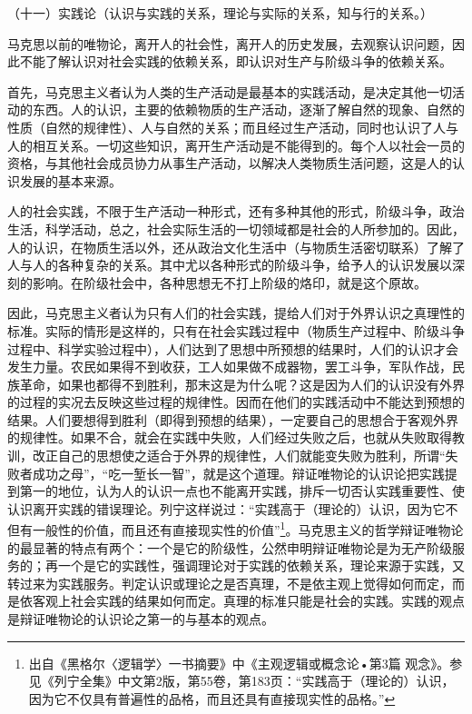 \documentclass[UTF8, 12pt, a4paper]{ctexrep}
\begin{document}
（十一）实践论（认识与实践的关系，理论与实际的关系，知与行的关系。）

马克思以前的唯物论，离开人的社会性，离开人的历史发展，去观察认识问题，因此不能了解认识对社会实践的依赖关系，即认识对生产与阶级斗争的依赖关系。

首先，马克思主义者认为人类的生产活动是最基本的实践活动，是决定其他一切活动的东西。人的认识，主要的依赖物质的生产活动，逐渐了解自然的现象、自然的性质（自然的规律性）、人与自然的关系；而且经过生产活动，同时也认识了人与人的相互关系。一切这些知识，离开生产活动是不能得到的。每个人以社会一员的资格，与其他社会成员协力从事生产活动，以解决人类物质生活问题，这是人的认识发展的基本来源。

人的社会实践，不限于生产活动一种形式，还有多种其他的形式，阶级斗争，政治生活，科学活动，总之，社会实际生活的一切领域都是社会的人所参加的。因此，人的认识，在物质生活以外，还从政治文化生活中（与物质生活密切联系）了解了人与人的各种复杂的关系。其中尤以各种形式的阶级斗争，给予人的认识发展以深刻的影响。在阶级社会中，各种思想无不打上阶级的烙印，就是这个原故。

因此，马克思主义者认为只有人们的社会实践，提给人们对于外界认识之真理性的标准。实际的情形是这样的，只有在社会实践过程中（物质生产过程中、阶级斗争过程中、科学实验过程中），人们达到了思想中所预想的结果时，人们的认识才会发生力量。农民如果得不到收获，工人如果做不成器物，罢工斗争，军队作战，民族革命，如果也都得不到胜利，那末这是为什么呢？这是因为人们的认识没有外界的过程的实况去反映这些过程的规律性。因而在他们的实践活动中不能达到预想的结果。人们要想得到胜利（即得到预想的结果），一定要自己的思想合于客观外界的规律性。如果不合，就会在实践中失败，人们经过失败之后，也就从失败取得教训，改正自己的思想使之适合于外界的规律性，人们就能变失败为胜利，所谓“失败者成功之母”，“吃一堑长一智”，就是这个道理。辩证唯物论的认识论把实践提到第一的地位，认为人的认识一点也不能离开实践，排斥一切否认实践重要性、使认识离开实践的错误理论。列宁这样说过：“实践高于（理论的）认识，因为它不但有一般性的价值，而且还有直接现实性的价值”\footnote{出自《黑格尔〈逻辑学〉一书摘要》中《主观逻辑或概念论•第3篇 观念》。参见《列宁全集》中文第2版，第55卷，第183页：“实践高于（理论的）认识，因为它不仅具有普遍性的品格，而且还具有直接现实性的品格。”}。马克思主义的哲学辩证唯物论的最显著的特点有两个：一个是它的阶级性，公然申明辩证唯物论是为无产阶级服务的；再一个是它的实践性，强调理论对于实践的依赖关系，理论来源于实践，又转过来为实践服务。判定认识或理论之是否真理，不是依主观上觉得如何而定，而是依客观上社会实践的结果如何而定。真理的标准只能是社会的实践。实践的观点是辩证唯物论的认识论之第一的与基本的观点。
\end{document}
